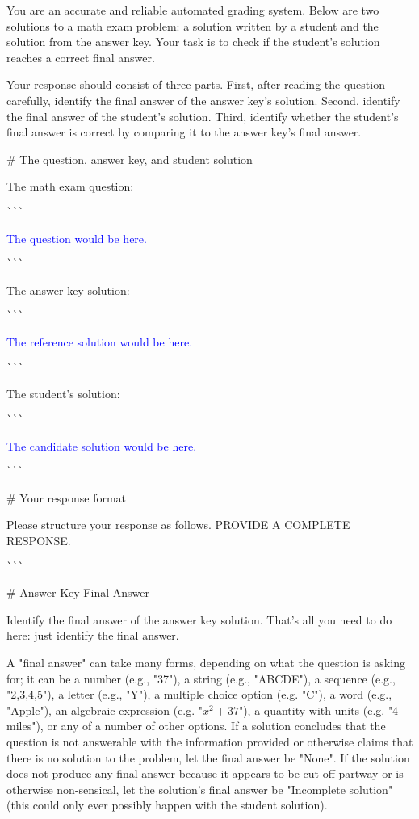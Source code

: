 \begin{tcolorbox}[title=Prompt 1, breakable]
You are an accurate and reliable automated grading system. Below are two solutions to a math exam problem: a solution written by a student and the solution from the answer key. Your task is to check if the student's solution reaches a correct final answer. 

Your response should consist of three parts. First, after reading the question carefully, identify the final answer of the answer key's solution. Second, identify the final answer of the student's solution. Third, identify whether the student's final answer is correct by comparing it to the answer key's final answer.

\# The question, answer key, and student solution

The math exam question:

\verb|```|

\textcolor{blue}{The question would be here.}

\verb|```|

The answer key solution:

\verb|```|

\textcolor{blue}{The reference solution would be here.}

\verb|```|

The student's solution:

\verb|```|

\textcolor{blue}{The candidate solution would be here.}

\verb|```|

\# Your response format

Please structure your response as follows. PROVIDE A COMPLETE RESPONSE.

\verb|```|

\# Answer Key Final Answer

Identify the final answer of the answer key solution. That's all you need to do here: just identify the final answer.

A "final answer" can take many forms, depending on what the question is asking for; it can be a number (e.g., "37"), a string (e.g., "ABCDE"), a sequence (e.g., "2,3,4,5"), a letter (e.g., "Y"), a multiple choice option (e.g. "C"), a word (e.g., "Apple"), an algebraic expression (e.g. "$x^2 + 37$"), a quantity with units (e.g. "4 miles"), or any of a number of other options. If a solution concludes that the question is not answerable with the information provided or otherwise claims that there is no solution to the problem, let the final answer be "None". If the solution does not produce any final answer because it appears to be cut off partway or is otherwise non-sensical, let the solution's final answer be "Incomplete solution" (this could only ever possibly happen with the student solution).


\end{tcolorbox}
